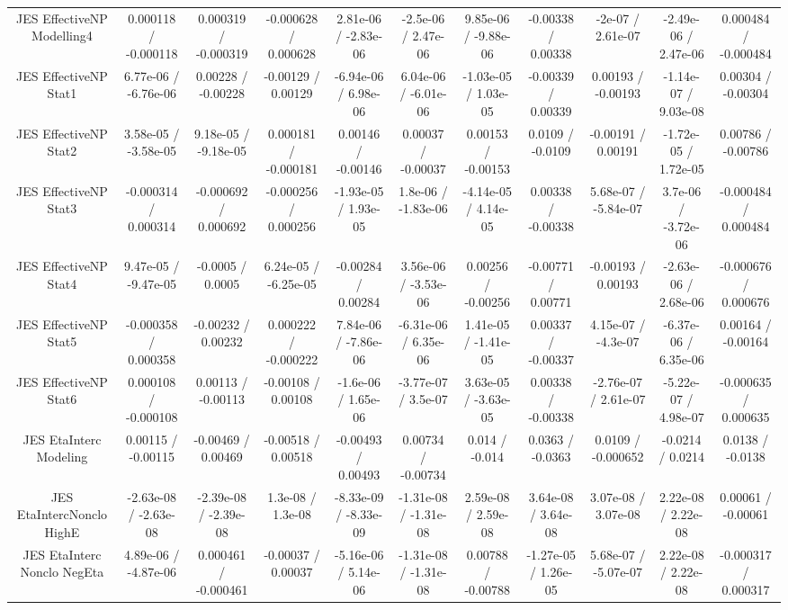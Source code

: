 {\begin{landscape}
\begin{longtable}{@{\extracolsep{\fill}}| *{11}{c|}}
  JES EffectiveNP Modelling4 & 0.000118 / -0.000118 & 0.000319 / -0.000319 & -0.000628 / 0.000628 & 2.81e-06 / -2.83e-06 & -2.5e-06 / 2.47e-06 & 9.85e-06 / -9.88e-06 & -0.00338 / 0.00338 & -2e-07 / 2.61e-07 & -2.49e-06 / 2.47e-06 & 0.000484 / -0.000484 \\ 
  JES EffectiveNP Stat1 & 6.77e-06 / -6.76e-06 & 0.00228 / -0.00228 & -0.00129 / 0.00129 & -6.94e-06 / 6.98e-06 & 6.04e-06 / -6.01e-06 & -1.03e-05 / 1.03e-05 & -0.00339 / 0.00339 & 0.00193 / -0.00193 & -1.14e-07 / 9.03e-08 & 0.00304 / -0.00304 \\ 
  JES EffectiveNP Stat2 & 3.58e-05 / -3.58e-05 & 9.18e-05 / -9.18e-05 & 0.000181 / -0.000181 & 0.00146 / -0.00146 & 0.00037 / -0.00037 & 0.00153 / -0.00153 & 0.0109 / -0.0109 & -0.00191 / 0.00191 & -1.72e-05 / 1.72e-05 & 0.00786 / -0.00786 \\ 
  JES EffectiveNP Stat3 & -0.000314 / 0.000314 & -0.000692 / 0.000692 & -0.000256 / 0.000256 & -1.93e-05 / 1.93e-05 & 1.8e-06 / -1.83e-06 & -4.14e-05 / 4.14e-05 & 0.00338 / -0.00338 & 5.68e-07 / -5.84e-07 & 3.7e-06 / -3.72e-06 & -0.000484 / 0.000484 \\ 
  JES EffectiveNP Stat4 & 9.47e-05 / -9.47e-05 & -0.0005 / 0.0005 & 6.24e-05 / -6.25e-05 & -0.00284 / 0.00284 & 3.56e-06 / -3.53e-06 & 0.00256 / -0.00256 & -0.00771 / 0.00771 & -0.00193 / 0.00193 & -2.63e-06 / 2.68e-06 & -0.000676 / 0.000676 \\ 
  JES EffectiveNP Stat5 & -0.000358 / 0.000358 & -0.00232 / 0.00232 & 0.000222 / -0.000222 & 7.84e-06 / -7.86e-06 & -6.31e-06 / 6.35e-06 & 1.41e-05 / -1.41e-05 & 0.00337 / -0.00337 & 4.15e-07 / -4.3e-07 & -6.37e-06 / 6.35e-06 & 0.00164 / -0.00164 \\ 
  JES EffectiveNP Stat6 & 0.000108 / -0.000108 & 0.00113 / -0.00113 & -0.00108 / 0.00108 & -1.6e-06 / 1.65e-06 & -3.77e-07 / 3.5e-07 & 3.63e-05 / -3.63e-05 & 0.00338 / -0.00338 & -2.76e-07 / 2.61e-07 & -5.22e-07 / 4.98e-07 & -0.000635 / 0.000635 \\ 
  JES EtaInterc Modeling & 0.00115 / -0.00115 & -0.00469 / 0.00469 & -0.00518 / 0.00518 & -0.00493 / 0.00493 & 0.00734 / -0.00734 & 0.014 / -0.014 & 0.0363 / -0.0363 & 0.0109 / -0.000652 & -0.0214 / 0.0214 & 0.0138 / -0.0138 \\ 
  JES EtaIntercNonclo HighE & -2.63e-08 / -2.63e-08 & -2.39e-08 / -2.39e-08 & 1.3e-08 / 1.3e-08 & -8.33e-09 / -8.33e-09 & -1.31e-08 / -1.31e-08 & 2.59e-08 / 2.59e-08 & 3.64e-08 / 3.64e-08 & 3.07e-08 / 3.07e-08 & 2.22e-08 / 2.22e-08 & 0.00061 / -0.00061 \\ 
  JES EtaInterc Nonclo NegEta & 4.89e-06 / -4.87e-06 & 0.000461 / -0.000461 & -0.00037 / 0.00037 & -5.16e-06 / 5.14e-06 & -1.31e-08 / -1.31e-08 & 0.00788 / -0.00788 & -1.27e-05 / 1.26e-05 & 5.68e-07 / -5.07e-07 & 2.22e-08 / 2.22e-08 & -0.000317 / 0.000317 \\ 

\end{longtable}
\end{landscape}}
